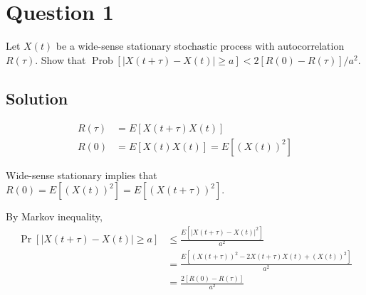 \section*{Question 1}

Let \( X(t) \) be a wide-sense stationary stochastic process with autocorrelation \( R(\tau) \).
Show that \( \operatorname{Prob}[|X(t+\tau)-X(t)| \geq a]<2[R(0)-R(\tau)] / a^{2} \).

\subsection*{Solution}

\begin{align*}
    R(\tau)
     & =
    E[X(t+\tau)X(t)]
    \\
    R(0)
     & =
    E[X(t)X(t)]
    =
    E[{(X(t))}^2]
\end{align*}

Wide-sense stationary implies that \( R(0) = E[{(X(t))}^2] = E[{(X(t+\tau))}^2] \).

By Markov inequality,
\begin{align*}
    \Pr [|X(t+\tau) - X(t)| \geq a]
     & \leq
    \frac{E[|X(t+\tau) - X(t)|^{2}]}{a^{2}}
    \\ & =
    \frac{
    E[{(X(t+\tau))}^{2} - 2X(t+\tau)X(t) + {(X(t))}^{2}]
    }{a^{2}}
    \\ & =
    \frac{
        2[R(0) - R(\tau)]
    }{a^{2}}
\end{align*}
